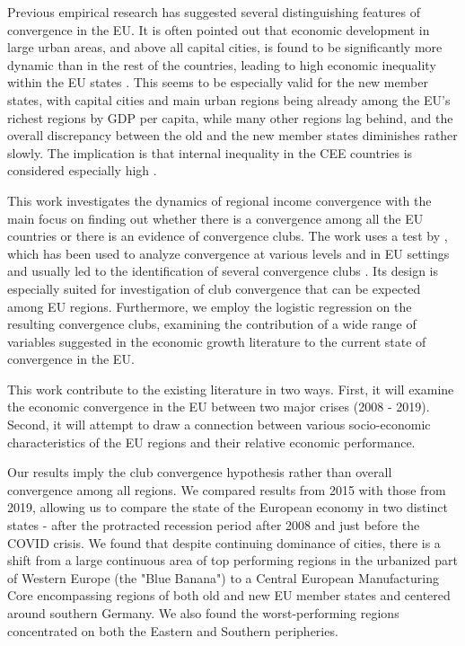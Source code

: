 \documentclass[11pt]{article}
\begin{document}
Previous empirical research has suggested several distinguishing features of convergence in the EU. It is often pointed out that economic development in large urban areas, and above all capital cities, is found to be significantly more dynamic than in the rest of the countries, leading to high economic inequality within the EU states \citep{geppert2008regional}. This seems to be especially valid for the new member states, with capital cities and main urban regions being already among the EU's richest regions by GDP per capita, while many other regions lag behind, and the overall discrepancy between the old and the new member states diminishes rather slowly. The implication is that internal inequality in the CEE countries is considered especially high \citep{geppert2008regional,sme2012regional, smketkowski2013regional}.


This work investigates the dynamics of regional income convergence with the main focus on finding out whether there is a convergence among all the EU countries or there is an evidence of convergence clubs. The work uses a test by \citet{phillips2007transition}, which has been used to analyze convergence at various levels and in EU settings and usually led to the identification of several convergence clubs \citep{bartkowska2012regional, borsi2015evolution, von2017regional}. Its design is especially suited for investigation of club convergence that can be expected among EU regions. Furthermore, we employ the logistic regression on the resulting convergence clubs, examining the contribution of a wide range of variables suggested in the economic growth literature to the current state of convergence in the EU.

This work contribute to the existing literature in two ways. First, it will examine the economic convergence in the EU between two major crises (2008 - 2019). Second, it will attempt to draw a connection between various socio-economic characteristics of the EU regions and their relative economic performance.

Our results imply the club convergence hypothesis rather than overall convergence among all regions. We compared results from 2015 with those from 2019, allowing us to compare the state of the European economy in two distinct states - after the protracted recession period after 2008 and just before the COVID crisis. We found that despite continuing dominance of cities, there is a shift from a large continuous area of top performing regions in the urbanized part of Western Europe (the "Blue Banana") to a Central European Manufacturing Core encompassing regions of both old and new EU member states and centered around southern Germany. We also found the worst-performing regions concentrated on both the Eastern and Southern peripheries.
\end{document}
